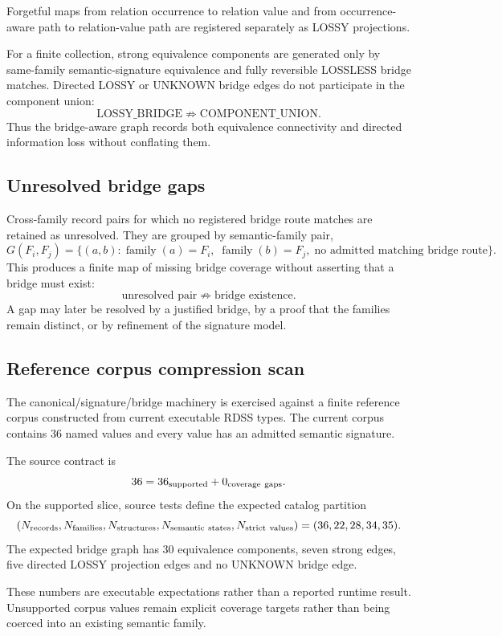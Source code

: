 \documentclass[11pt]{article}
\begin{document}
Forgetful maps from relation occurrence to relation value and from
occurrence-aware path to relation-value path are registered separately as
LOSSY projections.

For a finite collection, strong equivalence components are generated only by
same-family semantic-signature equivalence and fully reversible LOSSLESS bridge
matches. Directed LOSSY or UNKNOWN bridge edges do not participate in the
component union:
\[
\boxed{
\mathrm{LOSSY\_BRIDGE}
\not\Rightarrow
\mathrm{COMPONENT\_UNION}.
}
\]
Thus the bridge-aware graph records both equivalence connectivity and directed
information loss without conflating them.

\subsection{Unresolved bridge gaps}

Cross-family record pairs for which no registered bridge route matches are
retained as unresolved. They are grouped by semantic-family pair,
\[
G(F_i,F_j)
=
\{(a,b):\operatorname{family}(a)=F_i,\;
\operatorname{family}(b)=F_j,\;
\text{no admitted matching bridge route}\}.
\]
This produces a finite map of missing bridge coverage without asserting that a
bridge must exist:
\[
\boxed{
\text{unresolved pair}
\not\Rightarrow
\text{bridge existence}.
}
\]
A gap may later be resolved by a justified bridge, by a proof that the
families remain distinct, or by refinement of the signature model.

\subsection{Reference corpus compression scan}

The canonical/signature/bridge machinery is exercised against a finite
reference corpus constructed from current executable RDSS types. The current
corpus contains 36 named values and every value has an admitted semantic
signature.

The source contract is
\[
36
=
36_{\rm supported}
+
0_{\rm coverage\ gaps}.
\]
On the supported slice, source tests define the expected catalog partition
\[
(
N_{\rm records},
N_{\rm families},
N_{\rm structures},
N_{\rm semantic\ states},
N_{\rm strict\ values}
)
=
(36,22,28,34,35).
\]
The expected bridge graph has 30 equivalence components, seven strong edges,
five directed LOSSY projection edges and no UNKNOWN bridge edge.

These numbers are executable expectations rather than a reported runtime
result. Unsupported corpus values remain explicit coverage targets rather than
being coerced into an existing semantic family.
\end{document}
